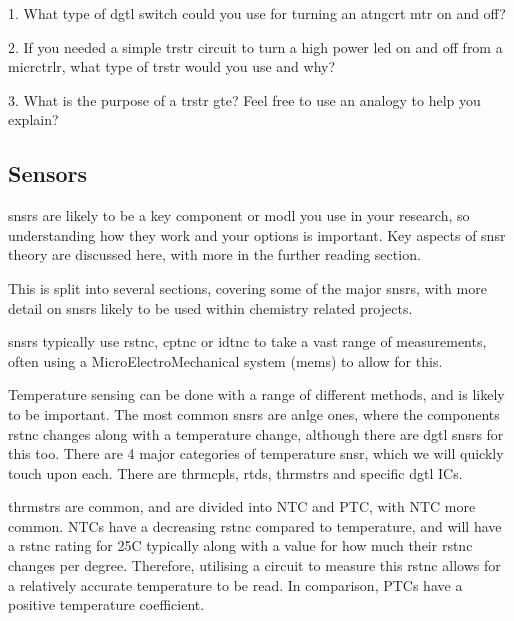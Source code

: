 \documentclass[a4paper,11pt]{report}
\newcommand{\Theory}[1] %
{
\phantomsection %
\todo[inline, color=green!30]{\textbf{#1}} %
\vspace{1em} %
}
\newcommand{\Quiz}[1] %
{
\par\noindent %
\phantomsection %
\todo[inline, color=blue!30]{\textbf{#1}} %
\vspace{1em} %
}
\begin{document}
\Quiz{Quiz}

1. What type of \gls{dgtl} switch could you use for turning an \gls{atngcrt} \gls{mtr} on and off?

2. If you needed a simple \gls{trstr} circuit to turn a high power \gls{led} on and off from a \gls{micrctrlr}, what type of \gls{trstr} would you use and why?

3. What is the purpose of a \gls{trstr} \gls{gte}? Feel free to use an analogy to help you explain?

\vspace*{1\baselineskip}

\subsection{Sensors}

\Theory{What are \gls{snsr}s?}

\gls{snsr}s are likely to be a key component or \gls{modl} you use in your research, so understanding how they work and your options is important. Key aspects of \gls{snsr} theory are discussed here, with more in the further reading section.

This is split into several sections, covering some of the major \gls{snsr}s, with more detail on \gls{snsr}s likely to be used within chemistry related projects.

\gls{snsr}s typically use \gls{rstnc}, \gls{cptnc} or \gls{idtnc} to take a vast range of measurements, often using a MicroElectroMechanical system (\gls{mems}) to allow for this.

Temperature sensing can be done with a range of different methods, and is likely to be important. The most common \gls{snsr}s are \gls{anlge} ones, where the components \gls{rstnc} changes along with a temperature change, although there are \gls{dgtl} \gls{snsr}s for this too. There are 4 major categories of temperature \gls{snsr}, which we will quickly touch upon each. There are \gls{thrmcpl}s, \gls{rtd}s, \gls{thrmstr}s and specific \gls{dgtl} ICs.

\gls{thrmstr}s are common, and are divided into NTC and PTC, with NTC more common. NTCs have a decreasing \gls{rstnc} compared to temperature, and will have a \gls{rstnc} rating for 25\degree C typically along with a value for how much their \gls{rstnc} changes per degree. Therefore, utilising a circuit to measure this \gls{rstnc} allows for a relatively accurate temperature to be read. In comparison, PTCs have a positive temperature coefficient.
\end{document}
